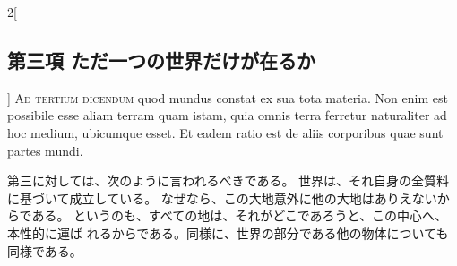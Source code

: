 \documentclass[paper=a4paper,fontsize=10pt,jafontsize=9pt,titlepage]{jlreq}
\begin{document}
\begin{paracol}{2}[\subsection{第三項 ただ一つの世界だけが在るか}]
{\scshape Ad tertium dicendum} quod mundus constat ex
sua tota materia. Non enim est possibile esse aliam terram quam istam,
quia omnis terra ferretur naturaliter ad hoc medium, ubicumque esset. Et
eadem ratio est de aliis corporibus quae sunt partes mundi.


\switchcolumn


第三に対しては、次のように言われるべきである。
世界は、それ自身の全質料に基づいて成立している。
なぜなら、この大地意外に他の大地はありえないからである。
というのも、すべての地は、それがどこであろうと、この中心へ、本性的に運ば
 れるからである。同様に、世界の部分である他の物体についても同様である。


\switchcolumn*



\end{paracol}
\end{document}
